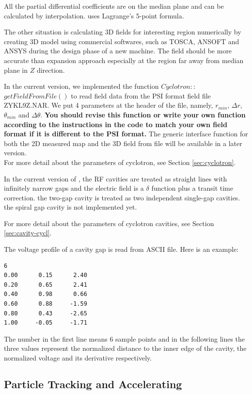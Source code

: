 All the partial differential coefficients are on the median plane and can be calculated by interpolation. \opalcycl uses  Lagrange's  5-point formula.

The other situation is calculating 3D fields for interesting region numerically by creating 3D model using commercial softwares,
such as TOSCA, ANSOFT and ANSYS during the design phase of a new machine. The field should be more accurate than 
expansion approach especially at the region far away from median plane in $Z$ direction.

In the current version, we implemented the function $Cyclotron::$$getFieldFromFile()$ to read field data from 
the PSI format field file {\small{ZYKL9Z.NAR}}. We put 4 parameters at the header of the file, namely, $r_{min}$, $\Delta r$,
$\theta_{min}$ and $\Delta \theta$.
{\bfseries You should revise this function or write your own function according to the instructions in the code to match your own field
  format if it is different to the PSI format.}  
The generic interface function for both the 2D measured map and the 3D field from file will be available in a later version.\\ 

For more detail about the parameters of cyclotron, see Section \ref{sec:cyclotron}.

In the current version of \opalcycl, the RF cavities are treated as straight lines with infinitely narrow gaps
and the electric field is a $\delta$ function plus a transit time correction.
the two-gap cavity is treated as two independent single-gap cavities. the spiral gap cavity is not implemented yet.

For more detail about the parameters of cyclotron cavities, see Section \ref{sec:cavity-cycl}.

The voltage profile of a cavity gap  is read from ASCII file. Here is an example:
\begin{verbatim}
6  
0.00      0.15      2.40 
0.20      0.65      2.41 
0.40      0.98      0.66 
0.60      0.88     -1.59 
0.80      0.43     -2.65 
1.00     -0.05     -1.71 
\end{verbatim}
The number in the first line means 6 sample points and in the following lines the three values represent the normalized distance to 
the inner edge of the cavity, the normalized voltage and its derivative respectively.

\subsection{Particle Tracking and Accelerating}  

